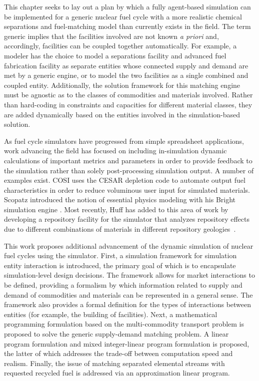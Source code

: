 This chapter seeks to lay out a plan by which a fully agent-based simulation can
be implemented for a generic nuclear fuel cycle with a more realistic chemical
separations and fuel-matching model than currently exists in the field. The term
generic implies that the facilities involved are not known \textit{a priori}
and, accordingly, facilities can be coupled together automatically. For example,
a modeler has the choice to model a separations facility and advanced fuel
fabrication facility as separate entities whose connected supply and demand are
met by a generic engine, or to model the two facilities as a single combined and
coupled entity. Additionally, the solution framework for this matching engine
must be agnostic as to the classes of commodities and materials involved. Rather
than hard-coding in constraints and capacities for different material classes,
they are added dynamically based on the entities involved in the
simulation-based solution.

As fuel cycle simulators have progressed from simple spreadsheet applications,
work advancing the field has focused on including in-simulation dynamic
calculations of important metrics and parameters in order to provide feedback to
the simulation rather than solely post-processing simulation output. A number of
examples exist. COSI uses the CESAR depletion code \cite{vidal_cesar:_2006} to
automate output fuel characteristics in order to reduce voluminous user input
for simulated materials. Scopatz introduced the notion of essential physics
modeling with his Bright simulation engine \cite{scopatz_essential_2011}. Most
recently, Huff has added to this area of work by developing a repository
facility for the \Cyclus simulator that analyzes repository effects due to
different combinations of materials in different repository
geologies~\cite{huff_integrated_2013}.

This work proposes additional advancement of the dynamic simulation of nuclear
fuel cycles using the \Cyclus simulator. First, a simulation framework for
simulation entity interaction is introduced, the primary goal of which is to
encapsulate simulation-level design decisions. The framework allows for market
interactions to be defined, providing a formalism by which information related
to supply and demand of commodities and materials can be represented in a
general sense. The framework also provides a formal definition for the types of
interactions between entities (for example, the building of facilities). Next, a
mathematical programming formulation based on the multi-commodity transport
problem is proposed to solve the generic supply-demand matching problem. A
linear program formulation and mixed integer-linear program formulation is
proposed, the latter of which addresses the trade-off between computation speed
and realism. Finally, the issue of matching separated elemental streams with
requested recycled fuel is addressed via an approximation linear program. 